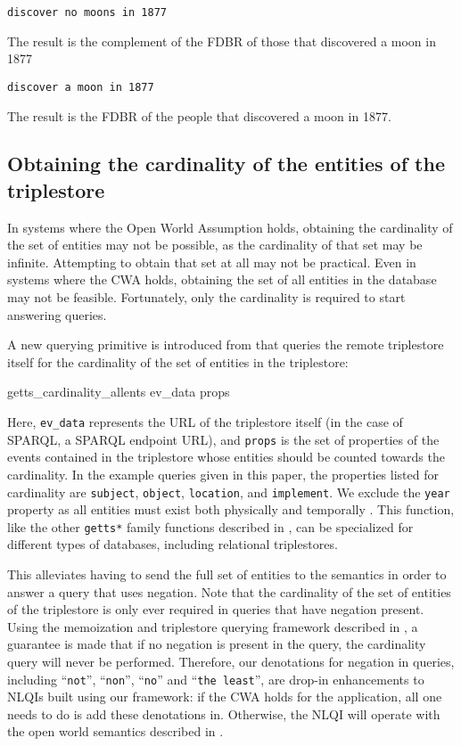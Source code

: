 \documentclass[../main.tex]{subfiles}
\begin{document}
\begin{refsection}
\examplespacing

\texttt{discover no moons in 1877}

\examplespacing

\noindent The result is the complement of the FDBR of those that discovered a moon in 1877

\examplespacing

\texttt{discover a moon in 1877}

\examplespacing

\noindent The result is the FDBR of the people that discovered a moon in 1877.

\subsection{Obtaining the cardinality of the entities of the triplestore}

In systems where the Open World Assumption holds, obtaining the cardinality of the set of entities
may not be possible, as the cardinality of that set may be infinite.  Attempting to obtain that set at all may not be practical.  Even in systems where the CWA holds, obtaining the set of all entities in the database may not be feasible.  Fortunately, only the cardinality is required to start answering queries.

A new querying primitive is introduced from \cite{peelar2020webistjournal} that queries the remote triplestore itself for the cardinality of the set of entities in the triplestore:
\begin{code}
    getts_cardinality_allents ev_data props
\end{code}
Here, \texttt{ev\_data} represents the URL of the triplestore itself (in the case of SPARQL, a SPARQL endpoint URL), and \texttt{props} is the set of properties of the events contained in the triplestore whose entities should be counted towards the cardinality.  In the example queries given in this paper, the properties listed for cardinality are \texttt{subject}, \texttt{object}, \texttt{location}, and \texttt{implement}.  We exclude the \texttt{year} property as all entities must exist both physically and temporally \cite{w3csemanticweb}.  This function, like the other  \texttt{getts*} family functions described in \cite{frostpeelar2019}, can be specialized for different types of databases, including relational triplestores.

This alleviates having to send the full set of entities to the semantics in order to answer a query that uses negation. Note that the cardinality of the set of entities of the triplestore is only ever required in queries that have negation present.  Using the memoization and triplestore querying framework described in \cite{peelar2020webistjournal}, a guarantee is made that if no negation is present in the query, the cardinality query will never be performed.  Therefore, our denotations for negation in queries, including ``\texttt{not}'', ``\texttt{non}'', ``\texttt{no}'' and ``\texttt{the least}'', are drop-in enhancements to NLQIs built using our framework: if the CWA holds for the application, all one needs to do is add these denotations in.  Otherwise, the NLQI will operate with the open world semantics described in \cite{frostpeelar2019}.


\end{refsection}
\end{document}
